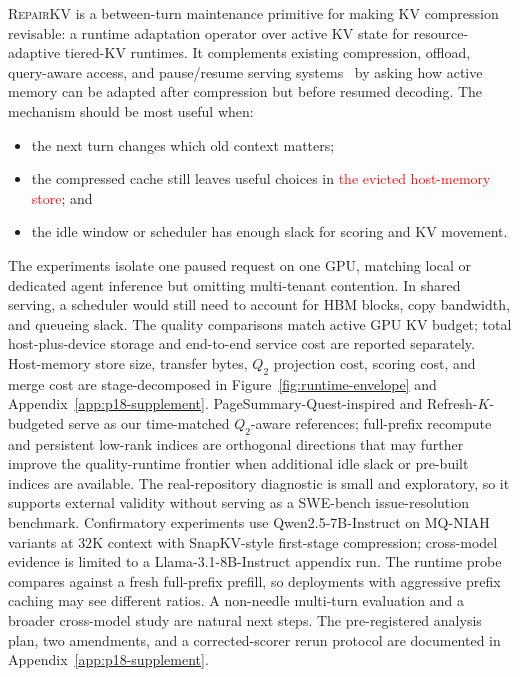\documentclass{article}
\newcommand{\repairkv}{\textsc{RepairKV}}
\begin{document}
\repairkv{} is a between-turn maintenance primitive for making KV
compression revisable: a runtime adaptation operator over active KV state
for resource-adaptive tiered-KV runtimes.
It complements existing compression, offload, query-aware access, and
pause/resume serving systems~\citep{vllm,infercept,lmcache,ttkv,
continuum,agentserve} by asking how active memory can be adapted after
compression but before resumed decoding.
The mechanism should be most useful when:
\begin{itemize}[leftmargin=1.4em,noitemsep,topsep=2pt]
  \item the next turn changes which old context matters;
  \item the compressed cache still leaves useful choices in \textcolor{red}{the evicted host-memory store}; and
  \item the idle window or scheduler has enough slack for scoring and KV
  movement.
\end{itemize}
The experiments isolate one paused request on one GPU, matching local or
dedicated agent inference but omitting multi-tenant contention.
In shared serving, a scheduler would still need to account for HBM blocks,
copy bandwidth, and queueing slack.
The quality comparisons match active GPU KV budget; total
host-plus-device storage and end-to-end service cost are reported
separately.
\textcolor{green!50!black}{Host-memory store size, transfer bytes, $Q_2$ projection cost, scoring cost, and merge cost are stage-decomposed in Figure~\ref{fig:runtime-envelope} and Appendix~\ref{app:p18-supplement}. PageSummary-Quest-inspired and Refresh-$K$-budgeted serve as our time-matched $Q_2$-aware references; full-prefix recompute and persistent low-rank indices are orthogonal directions that may further improve the quality-runtime frontier when additional idle slack or pre-built indices are available.}
The real-repository diagnostic is small and exploratory, so it supports
external validity without serving as a SWE-bench issue-resolution
benchmark.
\textcolor{green!50!black}{Confirmatory experiments use Qwen2.5-7B-Instruct on MQ-NIAH variants at $32$K context with SnapKV-style first-stage compression; cross-model evidence is limited to a Llama-3.1-8B-Instruct appendix run. The runtime probe compares against a fresh full-prefix prefill, so deployments with aggressive prefix caching may see different ratios. A non-needle multi-turn evaluation and a broader cross-model study are natural next steps. The pre-registered analysis plan, two amendments, and a corrected-scorer rerun protocol are documented in Appendix~\ref{app:p18-supplement}.}
\end{document}
